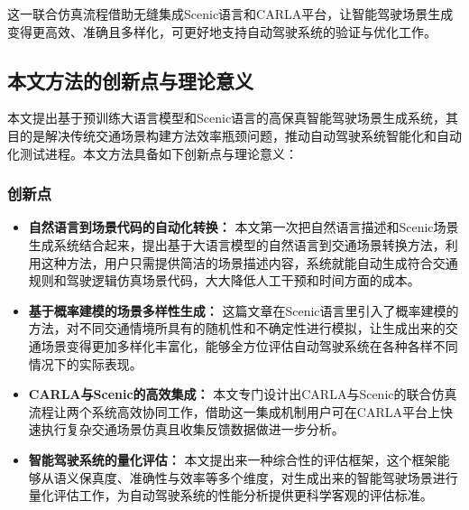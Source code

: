 这一联合仿真流程借助无缝集成Scenic语言和CARLA平台，让智能驾驶场景生成变得更高效、准确且多样化，可更好地支持自动驾驶系统的验证与优化工作。

\subsection{本文方法的创新点与理论意义}

本文提出基于预训练大语言模型和Scenic语言的高保真智能驾驶场景生成系统，其目的是解决传统交通场景构建方法效率瓶颈问题，推动自动驾驶系统智能化和自动化测试进程。本文方法具备如下创新点与理论意义：

\subsubsection{创新点}

\begin{itemize}
	\item \textbf{自然语言到场景代码的自动化转换：} 本文第一次把自然语言描述和Scenic场景生成系统结合起来，提出基于大语言模型的自然语言到交通场景转换方法，利用这种方法，用户只需提供简洁的场景描述内容，系统就能自动生成符合交通规则和驾驶逻辑仿真场景代码，大大降低人工干预和时间方面的成本。
	
	\item \textbf{基于概率建模的场景多样性生成：} 这篇文章在Scenic语言里引入了概率建模的方法，对不同交通情境所具有的随机性和不确定性进行模拟，让生成出来的交通场景变得更加多样化丰富化，能够全方位评估自动驾驶系统在各种各样不同情况下的实际表现。
	
	\item \textbf{CARLA与Scenic的高效集成：} 本文专门设计出CARLA与Scenic的联合仿真流程让两个系统高效协同工作，借助这一集成机制用户可在CARLA平台上快速执行复杂交通场景仿真且收集反馈数据做进一步分析。
	
	\item \textbf{智能驾驶系统的量化评估：} 本文提出来一种综合性的评估框架，这个框架能够从语义保真度、准确性与效率等多个维度，对生成出来的智能驾驶场景进行量化评估工作，为自动驾驶系统的性能分析提供更科学客观的评估标准。
\end{itemize}
